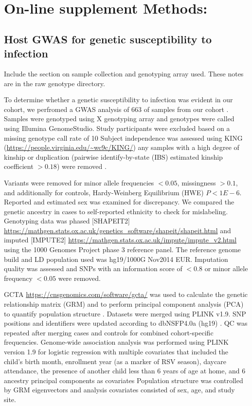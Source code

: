 \documentclass{article} %
\begin{document}
\section{On-line supplement Methods:}
\subsection{Host GWAS for genetic susceptibility to infection}

Include the section on sample collection and genotyping array used. 
These notes are in the raw genotype directory. 

To determine whether a genetic susceptibility to infection was evident in our cohort, 
we perfromed a GWAS analysis of 663 of samples from our cohort
\cite{lawless2020genome}.
Samples were genotyped using X genotyping array and genotypes were called using Illumina GenomeStudio. 
Study participants were excluded based on a missing genotype call rate of 10%
Subject independence was assessed using 
 KING (\url{https://people.virginia.edu/~wc9c/KING/})
any samples with a high degree of kinship or duplication 
(pairwise identify-by-state (IBS) estimated kinship coefficient $> 0.18$) were removed 
\cite{manichaikul_robust_2010}. 

Variants were removed for minor allele frequencies $<0.05$, missingness $>0.1$, 
and additionally for controls, Hardy-Weinberg Equilibrium (HWE) $P <1E-6$.
Reported and estimated sex was examined for discrepancy. 
We compared the genetic ancestry in cases to self-reported ethnicity to check for mislabeling. 
Genotyping data was phased 
[SHAPEIT2]
\url{https://mathgen.stats.ox.ac.uk/genetics_software/shapeit/shapeit.html}
and imputed 
[IMPUTE2] 
\url{https://mathgen.stats.ox.ac.uk/impute/impute_v2.html}
using the 1000 Genomes Project phase 3 reference panel. 
The reference genome build and LD population used was hg19/1000G Nov2014 EUR. 
Imputation quality was assessed and SNPs with an information score of $<0.8$ or minor allele frequency $<0.05$ were removed.

GCTA \url{https://cnsgenomics.com/software/gcta/}
was used to calculate the genetic relationship matrix (GRM) and to 
perform principal component analysis (PCA) 
to quantify population structure 
\cite{yang_gcta_2011}. 
Datasets were merged using PLINK v1.9. SNP positions and identifiers were 
updated according to dbNSFP4.0a (hg19) 
\cite{liu_dbnsfp_2016}.
QC was repeated after merging cases and controls for combined cohort-specific 
frequencies. 
Genome-wide association analysis was performed using PLINK version 1.9 for logistic regression with multiple covariates that included the child’s birth month, enrollment year (as a marker of RSV season), daycare attendance, the presence of another child less than 6 years of age at home, and 6 ancestry principal components as covariates
Population structure was controlled by GRM eigenvectors and analysis covariates consisted of sex, age, and study site.
\end{document}
